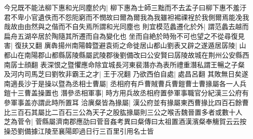 今兄既不能法柳下惠和光同塵於内|{
	柳下惠為士師三黜而不去孟子曰柳下惠不羞汙君不卑小官遺佚而不怨阨窮而不憫故曰爾為爾我為我雖袒裼祼裎於我側爾焉能凂我哉故由由然與之偕而不自失焉所謂和光同塵也}
則宜模范蠡遷化於外|{
	謂范蠡去越而扁舟五湖卒居於陶隨其所遷而自為變化也}
坐而自絶於時殆不可也望之不從尋復見害|{
	復扶又翻}
廙犇揚州南陽韓暨避袁術之命徙居山都山劉表又辟之遂遁居孱陵|{
	山都山在南陽郡山都縣孱陵縣屬武陵郡後劉備改曰公安賢曰孱陵故城在荆州公安縣西南孱士顔翻}
表深恨之暨懼應命除宜城長河東裴潛亦為表所禮重潛私謂王暢之子粲及河内司馬芝曰劉牧非霸王之才|{
	王于况翻}
乃欲西伯自處|{
	處昌呂翻}
其敗無日矣遂南適長沙于是操以暨為丞相士曹屬|{
	丞相府有戶曹賊曹兵曹鎧曹士曹掾屬各一人兵鎧十三曹盖操置也}
潛參丞相軍事|{
	時方用兵故丞相府置參軍事職官分紀漢三公府有參軍事盖亦謂此時所置耳}
洽廙粲皆為掾屬|{
	漢公府並有掾屬東西曹掾比四百石餘曹比三百石其屬比二百石三公為天子之股肱掾屬則三公之喉舌魏晉置多者或數十人}
芝為菅令|{
	菅縣屬濟南郡應劭曰菅音姦考異曰粲傳曰太祖置酒漢濱粲奉觴賀云云按操恐劉備據江陵至襄陽即過日行三百里引用名士皆}


